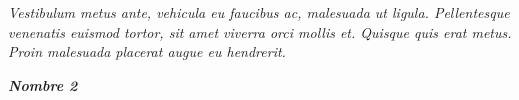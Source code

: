 
\begin{center}

\Large{}

\end{center}

\vspace{10cm}

\begin{flushright}

\parbox[t]{3.3in}{

\textit{
Vestibulum metus ante, vehicula eu faucibus ac, malesuada ut ligula. Pellentesque venenatis euismod tortor, sit amet viverra orci mollis et. Quisque quis erat metus. Proin malesuada placerat augue eu hendrerit. 
}

}

\vspace{2cm}

\textbf{\textit{Nombre 2}}

\end{flushright}

\pagestyle{empty}

